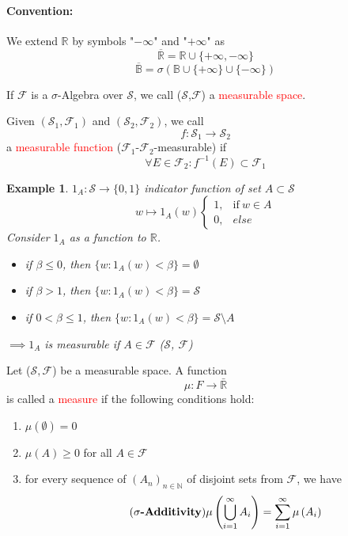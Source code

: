 \documentclass[10pt,a4paper]{article}
\theoremstyle{definition}
\theoremstyle{plain}
\newtheorem{example}{Example}[definition]
\begin{document}
\paragraph{Convention:} We extend $\mathbb{R}$ by symbols "$-\infty$" and "$+\infty$" as\\
	$$ \overline{\mathbb{R}} = \mathbb{R} \cup \{+\infty, -\infty\} $$
	$$ \overline{\mathbb{B}} = \sigma\left(\mathbb{B} \cup \{+\infty\} \cup \{-\infty\} \right)$$

\begin{boxeddef}
	\label{Measurable_Space}
	If $\mathcal{F}$ is a $\sigma$-Algebra over $\mathcal{S}$, we call ($\mathcal{S}$,$\mathcal{F}$) a \textcolor{red}{measurable space}. 
\end{boxeddef}

\begin{boxedsubdef}
	Given $(\mathcal{S}_1, \mathcal{F}_1)$ and $(\mathcal{S}_2, \mathcal{F}_2)$, we call
	$$f: \mathcal{S}_1 \rightarrow \mathcal{S}_2$$
	a \textcolor{red}{measurable function} ($\mathcal{F}_1$-$\mathcal{F}_2$-measurable) if
	 $$\forall E \in \mathcal{F}_2: f^{-1}(E) \subset \mathcal{F}_1$$
\end{boxedsubdef}

\begin{example}
$1_A : \mathcal{S} \rightarrow \{0, 1\}$ indicator function of set $A \subset \mathcal{S}$
$$w \mapsto 1_A(w) \begin{cases}
	1, & \text{if}\ w \in A \\
	0, & else
\end{cases}$$
Consider $1_A$ as a function to $\mathbb{R}$.
\begin{itemize}
	\item if $\beta \leq 0$, then $\{w: 1_A(w)<\beta\} = \emptyset$
	\item if $\beta > 1$, then $\{w: 1_A(w)<\beta\} = \mathcal{S}$
	\item if $0 < \beta \leq 1$, then $\{w: 1_A(w)<\beta\} = \mathcal{S} \setminus A$
\end{itemize}
$\implies 1_A$ is measurable if $A \in \mathcal{F}$ ($\mathcal{S}$, $\mathcal{F}$)
\end{example}

\begin{boxeddef}[Measure]
	\label{measure}
	Let ($\mathcal{S,F}$) be a measurable space. A function
	$$\mu: F \rightarrow \bar{\mathbb{R}}$$
	is called a \textcolor{red}{measure} if the following conditions hold:
	\begin{enumerate}
		\item $\mu(\emptyset) = 0$
		\item $\mu(A) \geq 0$ for all $A \in \mathcal{F}$
		\item  for every sequence of $(A_n)_{n \in \mathbb{N}}$ of disjoint sets from $\mathcal{F}$, we have 
			\begin{equation}
				\tag{\textbf{$\sigma\text{-Additivity}$}}
				\mu \left(\bigcup_{i = 1}^{\infty} A_i\right) = \sum_{i = 1}^{\infty} \mu\left(A_i\right)
			\end{equation} 
	\end{enumerate}
\end{boxeddef}
\end{document}
